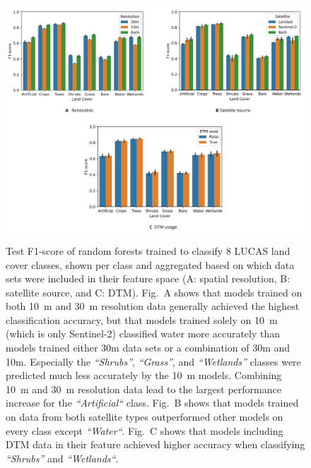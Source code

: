 \begin{figure}[!hbt]
    \includegraphics[width=\linewidth]{figs_02/fig_9_landcover_feature_space.png}

    \caption{Test F1-score of random forests trained to classify 8 LUCAS land cover classes, shown per class and aggregated based on which data sets were included in their feature space (A: spatial resolution, B: satellite source, and C: DTM). 
    Fig.\@~A shows that models trained on both 10\@~m and 30\@~m resolution data generally achieved the highest classification accuracy, but that models trained solely on 10~m (which is only Sentinel-2) classified water more accurately than models trained either 30m data sets or a combination of 30m and 10m. Especially the \emph{``Shrubs''}, \emph{``Grass''}, and \emph{``Wetlands''} classes were predicted much less accurately by the 10~m models. Combining 10\@~m and 30\@~m resolution data lead to the largest performance increase for the \emph{``Artificial``} class.
    Fig.\@~B shows that models trained on data from both satellite types outperformed other models on every class except \emph{``Water``}. 
    Fig.\@~C shows that models including DTM data in their feature achieved higher accuracy when classifying \emph{``Shrubs''} and \emph{``Wetlands``}.
    } 
    \label{fig:9_landcover_feature_space}
\end{figure}



